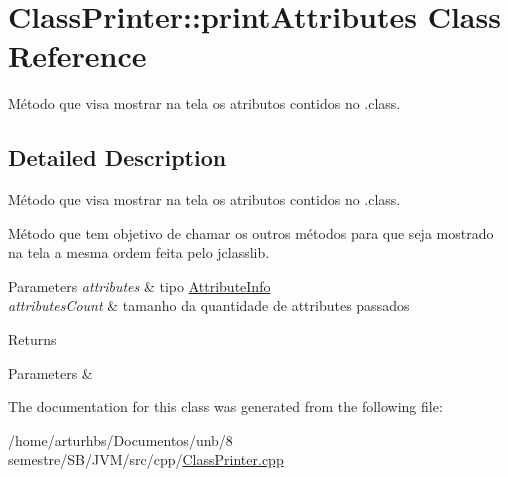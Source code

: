 \hypertarget{classClassPrinter_1_1printAttributes}{}\section{Class\+Printer\+:\+:print\+Attributes Class Reference}
\label{classClassPrinter_1_1printAttributes}


Método que visa mostrar na tela os atributos contidos no .class.  




\subsection{Detailed Description}
Método que visa mostrar na tela os atributos contidos no .class. 

Método que tem objetivo de chamar os outros métodos para que seja mostrado na tela a mesma ordem feita pelo jclasslib.


\begin{DoxyParams}{Parameters}
{\em attributes} & tipo \hyperlink{classAttributeInfo}{Attribute\+Info} \\
\hline
{\em attributes\+Count} & tamanho da quantidade de attributes passados \\
\hline
\end{DoxyParams}
\begin{DoxyReturn}{Returns}

\end{DoxyReturn}

\begin{DoxyParams}{Parameters}
{\em } & \\
\hline
\end{DoxyParams}


The documentation for this class was generated from the following file\+:\begin{DoxyCompactItemize}
\item 
/home/arturhbs/\+Documentos/unb/8 semestre/\+S\+B/\+J\+V\+M/src/cpp/\hyperlink{ClassPrinter_8cpp}{Class\+Printer.\+cpp}\end{DoxyCompactItemize}
